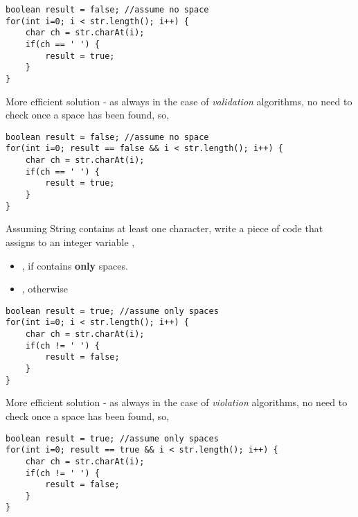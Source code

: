 \begin{questions}
\begin{solution}
\begin{lstlisting}
boolean result = false; //assume no space
for(int i=0; i < str.length(); i++) {
	char ch = str.charAt(i);
	if(ch == ' ') {
		result = true;
	}
}
\end{lstlisting}	
More efficient solution - as always in the case of \emph{validation} algorithms, no need to check once a space has been found, so, 

\begin{lstlisting}
boolean result = false; //assume no space
for(int i=0; result == false && i < str.length(); i++) {
	char ch = str.charAt(i);
	if(ch == ' ') {
		result = true;
	}
}
\end{lstlisting}	
\end{solution}

\question Assuming String  contains at least one character, write a piece of code that assigns to an integer variable , 

\begin{itemize}
\item {}, if  contains \textbf{only} spaces.	
\item {}, otherwise
\end{itemize}

\begin{solution}
\begin{lstlisting}
boolean result = true; //assume only spaces
for(int i=0; i < str.length(); i++) {
	char ch = str.charAt(i);
	if(ch != ' ') {
		result = false;
	}
}
\end{lstlisting}	
More efficient solution - as always in the case of \emph{violation} algorithms, no need to check once a space has been found, so, 

\begin{lstlisting}
boolean result = true; //assume only spaces
for(int i=0; result == true && i < str.length(); i++) {
	char ch = str.charAt(i);
	if(ch != ' ') {
		result = false;
	}
}
\end{lstlisting}	
\end{solution}
\end{questions}